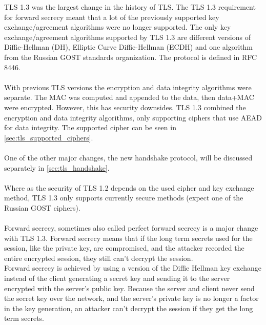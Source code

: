 TLS 1.3 was the largest change in the history of TLS. The TLS 1.3 requirement for forward secrecy meant that a lot of the previously supported key exchange/agreement algorithms were no longer supported. The only key exchange/agreement algorithms supported by TLS 1.3 are different versions of Diffie-Hellman (DH), Elliptic Curve Diffie-Hellman (ECDH) and one algorithm from the Russian GOST standards organization. The protocol is defined in RFC 8446.
\\\\
With previous TLS versions the encryption and data integrity algorithms were separate. The MAC was computed and appended to the data, then data+MAC were encrypted. However, this has security downsides. TLS 1.3 combined the encryption and data integrity algorithms, only supporting ciphers that use AEAD for data integrity. The supported cipher can be seen in \ref{sec:tls_supported_ciphers}.
\\\\
One of the other major changes, the new handshake protocol, will be discussed separately in \ref{sec:tls_handshake}.
\\\\
Where as the security of TLS 1.2 depends on the used cipher and key exchange method, TLS 1.3 only supports currently secure methods (expect one of the Russian GOST ciphers).
\\\\
Forward secrecy, sometimes also called perfect forward secrecy is a major change with TLS 1.3. Forward secrecy means that if the long term secrets used for the session, like the private key, are compromised, and the attacker recorded the entire encrypted session, they still can't decrypt the session.
\\
Forward secrecy is achieved by using a version of the Diffie Hellman key exchange instead of the client generating a secret key and sending it to the server encrypted with the server's public key. Because the server and client never send the secret key over the network, and the server's private key is no longer a factor in the key generation, an attacker can't decrypt the session if they get the long term secrets.